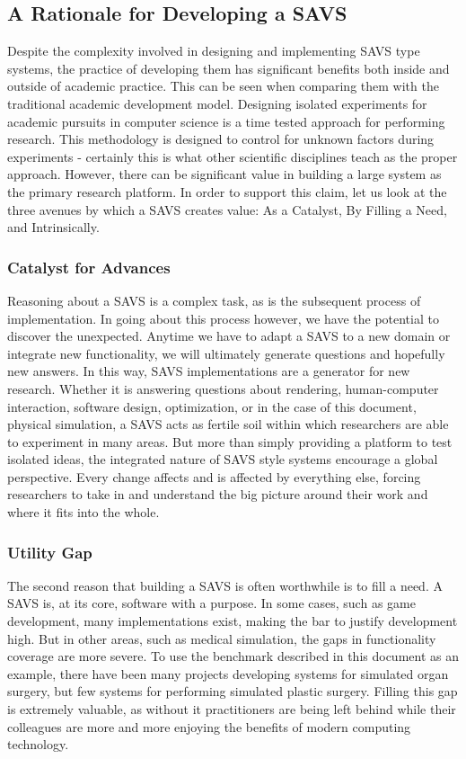  
\subsection{A Rationale for Developing a SAVS}

Despite the complexity involved in designing and implementing SAVS
type systems, the practice of developing them has significant benefits
both inside and outside of academic practice. This can be seen when
comparing them with the traditional academic development model.
Designing isolated experiments for academic pursuits in computer
science is a time tested approach for performing research. This
methodology is designed to control for unknown factors during
experiments - certainly this is what other scientific disciplines
teach as the proper approach. However, there can be significant value
in building a large system as the primary research platform. In order to
support this claim, let us look at the three avenues by which a
SAVS creates value: As a Catalyst, By Filling a Need, and
Intrinsically.

\subsubsection{Catalyst for Advances}

Reasoning about a SAVS is a complex task, as is the subsequent process
of implementation. In going about this process however, we have the
potential to discover the unexpected. Anytime we have to adapt a SAVS
to a new domain or integrate new functionality, we will ultimately
generate questions and hopefully new answers. In this way, SAVS
implementations are a generator for new research. Whether it is
answering questions about rendering, human-computer interaction,
software design, optimization, or in the case of this document,
physical simulation, a SAVS acts as fertile soil within which
researchers are able to experiment in many areas. But more than simply
providing a platform to test isolated ideas, the integrated nature of
SAVS style systems encourage a global perspective. Every change affects
and is affected by everything else, forcing researchers to take in and
understand the big picture around their work and where it fits into
the whole.

\subsubsection{Utility Gap}

The second reason that building a SAVS is often worthwhile is to fill
a need. A SAVS is, at its core, software with a purpose. In some
cases, such as game development, many implementations exist, making
the bar to justify development high. But in other areas, such as
medical simulation, the gaps in functionality coverage are more
severe. To use the benchmark described in this document as an example,
there have been many projects developing systems for simulated organ
surgery, but few systems for performing simulated plastic
surgery. Filling this gap is extremely valuable, as without it
practitioners are being left behind while their colleagues are
more and more enjoying the benefits of modern computing technology.

